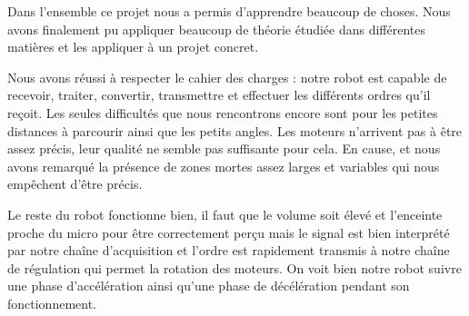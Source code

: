 Dans l’ensemble ce projet nous a permis d’apprendre beaucoup de choses. Nous avons finalement pu appliquer beaucoup de théorie étudiée dans différentes matières et les appliquer à un projet concret. 

Nous avons réussi à respecter le cahier des charges : notre robot est capable de recevoir, traiter, convertir, transmettre et effectuer les différents ordres qu’il reçoit. Les seules difficultés que nous rencontrons encore sont pour les petites distances à parcourir ainsi que les petits angles. Les moteurs n’arrivent pas à être assez précis, leur qualité ne semble pas suffisante pour cela. En cause, et nous avons remarqué la présence de zones mortes assez larges et variables qui nous empêchent d’être précis. 

Le reste du robot fonctionne bien, il faut que le volume soit élevé et l’enceinte proche du micro pour être correctement perçu mais le signal est bien interprété par notre chaîne d’acquisition et l’ordre est rapidement transmis à notre chaîne de régulation qui permet la rotation des moteurs. On voit bien notre robot suivre une phase d’accélération ainsi qu’une phase de décélération pendant son fonctionnement. 
